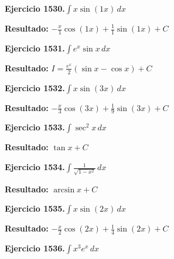\documentclass[10pt,a4paper]{article}
\begin{document}
\begin{ejbox}
\textbf{Ejercicio 1530.}\quad $\int x \sin(1x)\,dx$
\end{ejbox}

\begin{solbox}
\textbf{Resultado:} \(\displaystyle -\frac{x}{1}\cos(1x) + \frac{1}{1}\sin(1x) + C\)
\end{solbox}

\newpage
\begin{ejbox}
\textbf{Ejercicio 1531.}\quad $\int e^x\sin x\,dx$
\end{ejbox}

\begin{solbox}
\textbf{Resultado:} \(\displaystyle I = \frac{e^x}{2}(\sin x - \cos x) + C\)
\end{solbox}

\begin{ejbox}
\textbf{Ejercicio 1532.}\quad $\int x \sin(3x)\,dx$
\end{ejbox}

\begin{solbox}
\textbf{Resultado:} \(\displaystyle -\frac{x}{3}\cos(3x) + \frac{1}{9}\sin(3x) + C\)
\end{solbox}

\begin{ejbox}
\textbf{Ejercicio 1533.}\quad $\int \sec^2 x\,dx$
\end{ejbox}

\begin{solbox}
\textbf{Resultado:} \(\displaystyle \tan x + C\)
\end{solbox}

\newpage
\begin{ejbox}
\textbf{Ejercicio 1534.}\quad $\int \frac{1}{\sqrt{1-x^2}}\,dx$
\end{ejbox}

\begin{solbox}
\textbf{Resultado:} \(\displaystyle \arcsin x + C\)
\end{solbox}

\begin{ejbox}
\textbf{Ejercicio 1535.}\quad $\int x \sin(2x)\,dx$
\end{ejbox}

\begin{solbox}
\textbf{Resultado:} \(\displaystyle -\frac{x}{2}\cos(2x) + \frac{1}{4}\sin(2x) + C\)
\end{solbox}

\begin{ejbox}
\textbf{Ejercicio 1536.}\quad $\int x^{3} e^x\,dx$
\end{ejbox}
\end{document}

